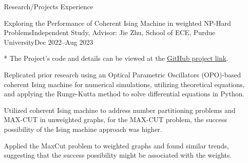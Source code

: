 \documentclass[]{kyvernitis-resume}
\begin{document}
\begin{section}{\Large Research/Projects Experience}
    
    
    \begin{subsection}{Exploring the Performance of Coherent Ising Machine in weighted NP-Hard Problems}{Independent Study, Advisor: Jie Zhu, School of ECE, Purdue University}{Dec 2022--Aug 2023}{}
    \item[*] The Project's code and details can be viewed at the  \href{https://github.com/Wang-Zhiping/Exploring-the-Performance-of-Coherent-Ising-Machine-in-weighted-NP-Hard-Problems}{GitHub project link}.
    
        \item Replicated prior research using an Optical Parametric Oscillators (OPO)-based coherent Ising machine for numerical simulations, utilizing theoretical equations, and applying the Runge-Kutta method to solve differential equations in Python.
        \item Utilized coherent Ising machine to address number partitioning problems and MAX-CUT in unweighted graphs, for the MAX-CUT problem, the success possibility of the Ising machine approach was higher.
        \item Applied the MaxCut problem to weighted graphs and found similar trends, suggesting that the success possibility might be associated with the weights.
    \end{subsection}

    
    

\end{section}
\end{document}
